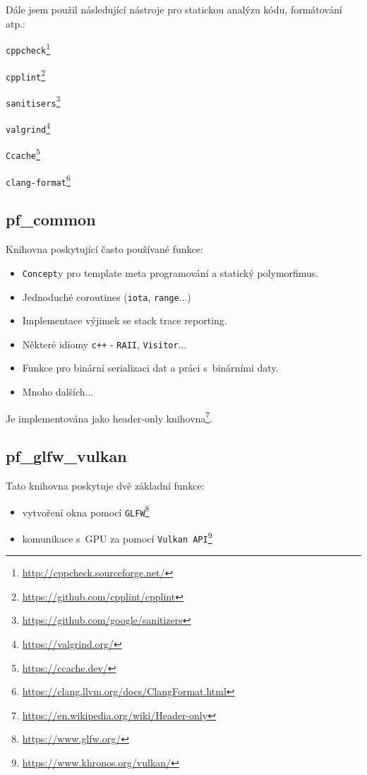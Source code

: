 Dále jsem použil následující nástroje pro statickou analýzu kódu, formátování atp.:
\begin{itemize}
\end{itemize}

\subsection{pf\_common}
Knihovna poskytující často používané funkce:
\begin{itemize}
	\item \texttt{Concept}y pro template meta programování a statický polymorfimus.
	\item Jednoduché coroutines (\texttt{iota}, \texttt{range}...)
	\item Implementace výjimek se stack trace reporting.
	\item Některé idiomy \texttt{c++} - \texttt{RAII}, \texttt{Visitor}...
	\item Funkce pro binární serializaci dat a práci s~binárními daty.
	\item Mnoho dalších...
\end{itemize}

Je implementována jako header-only knihovna\footnote{\url{https://en.wikipedia.org/wiki/Header-only}}.

\subsection{pf\_glfw\_vulkan}
Tato knihovna poskytuje dvě základní funkce:
\begin{itemize}
	\item vytvoření okna pomocí \texttt{GLFW}\footnote{\url{https://www.glfw.org/}}
	\item komunikace s~GPU za pomocí \texttt{Vulkan API}\footnote{\url{https://www.khronos.org/vulkan/}}
\end{itemize}

